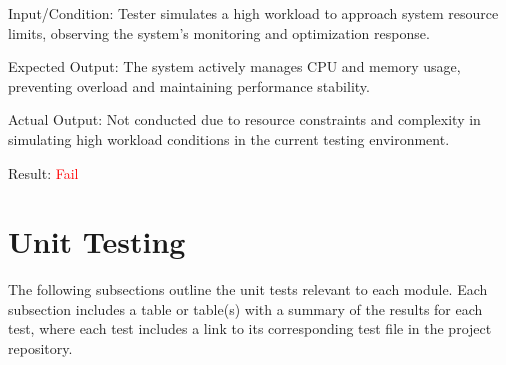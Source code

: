 \documentclass[12pt, titlepage]{article}
\begin{document}
\begin{enumerate}
Input/Condition: Tester simulates a high workload to approach system resource
limits, observing the system's monitoring and optimization response.
  
Expected Output: The system actively manages CPU and memory usage, preventing
overload and maintaining performance stability.

Actual Output: Not conducted due to resource constraints and complexity in
simulating high workload conditions in the current testing environment.

Result: \textcolor{red}{Fail}

\end{enumerate}

\section{Unit Testing}

The following subsections outline the unit tests relevant to each module. Each
subsection includes a table or table(s) with a summary of the results for each test,
where each test includes a link to its corresponding test file in the project repository.
\end{document}
